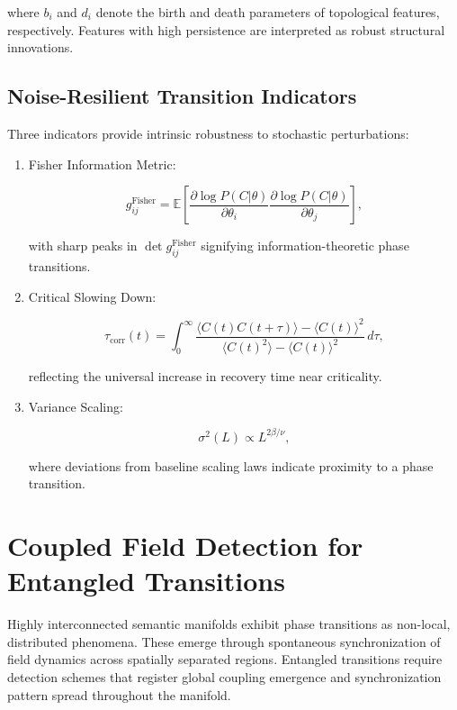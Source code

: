 where \(b_i\) and \(d_i\) denote the birth and death parameters of topological features, respectively. Features with high persistence are interpreted as robust structural innovations.

\subsection{Noise-Resilient Transition Indicators}

Three indicators provide intrinsic robustness to stochastic perturbations:

\begin{enumerate}
    \item Fisher Information Metric:

    \begin{equation}
    g_{ij}^{\text{Fisher}} = \mathbb{E}\left[\frac{\partial \log P(C|\theta)}{\partial \theta_i}\frac{\partial \log P(C|\theta)}{\partial \theta_j}\right],
    \end{equation}

    with sharp peaks in \(\det g_{ij}^{\text{Fisher}}\) signifying information-theoretic phase transitions.

    \item Critical Slowing Down:

    \begin{equation}
    \tau_{\text{corr}}(t) = \int_0^{\infty} \frac{\langle C(t)C(t+\tau) \rangle - \langle C(t) \rangle^2}{\langle C(t)^2 \rangle - \langle C(t) \rangle^2} \, d\tau,
    \end{equation}

    reflecting the universal increase in recovery time near criticality.

    \item Variance Scaling:

    \begin{equation}
    \sigma^2(L) \propto L^{2\beta/\nu},
    \end{equation}

    where deviations from baseline scaling laws indicate proximity to a phase transition.
\end{enumerate}

\section{Coupled Field Detection for Entangled Transitions}

Highly interconnected semantic manifolds exhibit phase transitions as non-local, distributed phenomena. These emerge through spontaneous synchronization of field dynamics across spatially separated regions. Entangled transitions require detection schemes that register global coupling emergence and synchronization pattern spread throughout the manifold.

